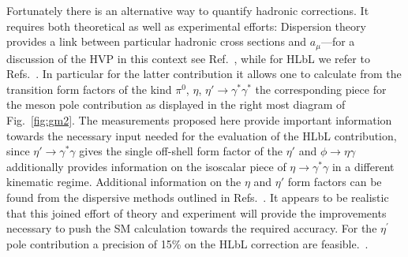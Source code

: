 \documentclass[11pt,a4paper,twocolumn]{article}
\def\etaP{\eta^{\prime}}
\begin{document}
Fortunately there is an alternative way to quantify hadronic corrections. It requires both
theoretical as well as experimental efforts:
Dispersion theory provides a link between particular hadronic cross sections
and $a_\mu$---for a discussion of the HVP in this context see Ref.~\cite{Jegerlehner:2009ry}, while 
for HLbL we refer to Refs.~\cite{Colangelo:2014dfa,Pauk:2014rfa,Colangelo:2014pva,Colangelo:2015ama}.  
In particular for the latter contribution it allows one to calculate from the transition
form factors of the kind $\pi^0$, $\eta$, $\eta'\to \gamma^*\gamma^*$ 
the corresponding piece for the meson pole contribution as displayed in the
right most diagram of Fig.~\ref{fig:gm2}.
The measurements proposed here provide important information towards
the necessary input needed for the evaluation of the HLbL contribution, since
$\eta'\to \gamma^*\gamma$ gives the single off-shell form factor of the $\eta'$
and $\phi\to \eta\gamma$ additionally provides information on the isoscalar
piece of $\eta\to \gamma^*\gamma$ in a different kinematic regime.
Additional information on the  $\eta$ and
$\eta'$ form factors can be found from the dispersive methods outlined in
Refs.~\cite{Adlarson:2011xb,Stollenwerk:2011zz,Hanhart:2013vba,Kubis:2015sga,Xiao:2015uva}.
It  appears to be realistic that this joined effort of theory and experiment
will provide the improvements necessary to push the SM calculation towards
the required accuracy. For the $\etaP$ pole contribution a precision of 15\% on the HLbL correction are feasible.~\cite{Nyffeler}.
\end{document}
